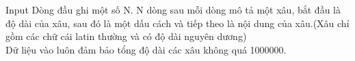 Input
Dòng đầu ghi một số N. N dòng sau mỗi dòng mô tả một xâu, bắt đầu là độ dài của xâu, sau đó là một dấu cách và tiếp theo là nội dung của xâu.(Xâu chỉ gồm các chữ cái latin thường và có độ dài nguyên dương)   
\\   Dữ liệu vào luôn đảm bảo tổng độ dài các xâu không quá 1000000.